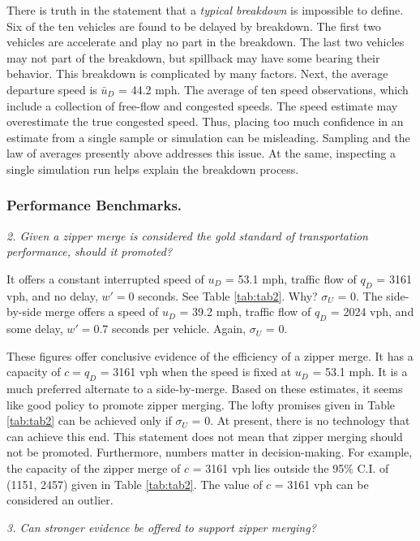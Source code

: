 \documentclass[Proceedings]{ascelike}
\begin{document}
There is truth in the statement that a \emph{typical breakdown} is impossible to define. Six of the ten vehicles are found to be delayed by breakdown. The first two vehicles are accelerate and play no part in the breakdown. The last two vehicles may not part of the breakdown, but spillback may have some bearing their behavior. This breakdown is complicated by many factors. Next, the  average departure speed is $\bar{u}_D$ = 44.2 mph. The average of ten speed observations, which include a collection of free-flow and congested speeds. The speed estimate may overestimate the true congested speed. Thus, placing too much confidence in an estimate from a single sample or simulation can be misleading.  Sampling and the law of averages  presently above addresses this issue. At the same, inspecting a single simulation run helps explain the breakdown process.

\subsubsection{Performance Benchmarks.}

\noindent \emph{2. Given a zipper merge is considered the gold standard of transportation performance, should it promoted?}

 It offers a constant interrupted speed of $u_D$ = 53.1 mph,  traffic flow of $q_D$ = 3161 vph, and no delay, $w' = 0$ seconds. See Table \ref{tab:tab2}. Why? $\sigma_U$ = 0. The side-by-side merge offers a speed of $u_D$ = 39.2 mph, traffic flow of  $q_D$ = 2024 vph, and some delay, $w' = 0.7$ seconds per vehicle. Again, $\sigma_U$ = 0.  

 These figures offer conclusive evidence of the efficiency of a zipper merge. It has a capacity of $c = q_D$ = 3161 vph when the speed is fixed at $u_D$ = 53.1 mph. It is a much preferred alternate to a side-by-merge.  Based on these estimates, it seems like good policy to promote zipper merging.  The lofty promises given in Table \ref{tab:tab2} can be achieved only if  $\sigma_U$ = 0. At present, there is no technology that can achieve this end.    This statement does not mean that zipper merging should not be promoted. Furthermore, numbers matter in decision-making. For example, the capacity of the zipper merge  of $c$ = 3161 vph lies outside the 95$\%$ C.I. of (1151, 2457) given in Table \ref{tab:tab2}. The value of $c$ = 3161 vph can be considered an outlier.

\noindent \emph{3. Can stronger evidence be offered to support  zipper merging?}
\end{document}
